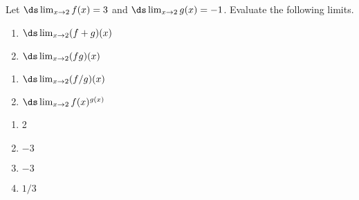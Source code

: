 {Let $\ds \lim_{x\to2} f(x) = 3$ and $\ds \lim_{x\to2} g(x) = -1$. Evaluate the following limits.

\begin{minipage}[t]{.5\linewidth}
\begin{enumerate}
\item		$\ds \lim_{x\to2}(f+g)(x)$
\item		$\ds \lim_{x\to2}(fg)(x)$
\end{enumerate}
\end{minipage}
\begin{minipage}[t]{.5\linewidth}
\begin{enumerate}\addtocounter{enumi}{2}
\item		$\ds \lim_{x\to2}(f/g)(x)$
\item		$\ds \lim_{x\to2}f(x)^{g(x)}$
\end{enumerate}
\end{minipage}
}
{\begin{enumerate}
\item		2
\item		$-3$
\item		$-3$
\item		$1/3$
\end{enumerate}
}
